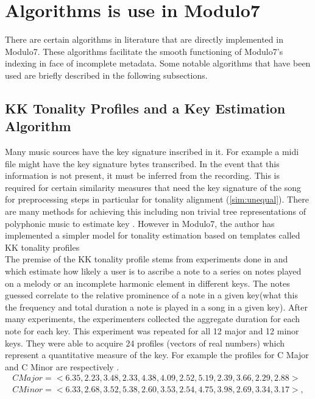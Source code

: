 \chapter{Algorithms is use in Modulo7}

\noindent There are certain algorithms in literature that are directly implemented in Modulo7. These algorithms facilitate the smooth functioning of Modulo7's indexing in face of incomplete metadata. Some notable algorithms that have been used are briefly described in the following subsections. 

\section{KK Tonality Profiles and a Key Estimation Algorithm}

\noindent Many music sources have the key signature inscribed in it. For example a midi file might have the key signature bytes transcribed. In the event that this information is not present, it must be inferred from the recording. This is required for certain similarity measures that need the key signature of the song for preprocessing steps  in particular for tonality alignment (\ref{sim:unequal}). There are many methods for achieving this including non trivial tree representations of polyphonic music to estimate key \cite{treemodel}. However in Modulo7, the author has implemented a simpler model for tonality estimation based on templates called KK tonality profiles \cite{kkTonalityKeyFinding} \\

\noindent The premise of the KK tonality profile stems from experiments done in \cite{kkTonalityKeyFinding} and \cite{kkcognitive} which estimate how likely a user is to ascribe a note to a series on notes played on a melody or an incomplete harmonic element in different keys. The notes guessed correlate to the relative prominence of a note in a given key(what this the frequency and total duration a note is played in a song in a given key). After many experiments, the experimenters collected the aggregate duration for each note for each key. This experiment was  repeated for all 12 major and 12 minor keys. They were able to acquire 24 profiles (vectors of real numbers) which represent a quantitative measure of the key. For example the profiles for C Major and C Minor are respectively \cite{kkcognitive}.
\begin{equation}
\begin{aligned}
  CMajor = <6.35, 2.23, 3.48, 2.33, 4.38, 4.09, 2.52, 5.19, 2.39, 3.66, 2.29, 2.88> \\
  CMinor = <6.33, 2.68, 3.52, 5.38, 2.60, 3.53, 2.54, 4.75, 3.98, 2.69, 3.34, 3.17>, 
\end{aligned}
\end{equation}

